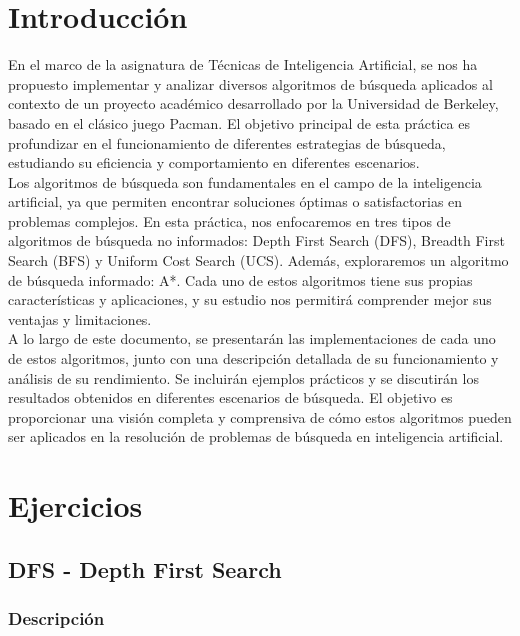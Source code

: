\documentclass{report}
\begin{document}
    \chapter{Introducción}
      {
        En el marco de la asignatura de Técnicas de Inteligencia Artificial, se nos ha propuesto implementar y analizar diversos algoritmos de búsqueda aplicados al contexto de un proyecto académico desarrollado por la Universidad de Berkeley, basado en el clásico juego Pacman. El objetivo principal de esta práctica es profundizar en el funcionamiento de diferentes estrategias de búsqueda, estudiando su eficiencia y comportamiento en diferentes escenarios.\\

        Los algoritmos de búsqueda son fundamentales en el campo de la inteligencia artificial, ya que permiten encontrar soluciones óptimas o satisfactorias en problemas complejos. En esta práctica, nos enfocaremos en tres tipos de algoritmos de búsqueda no informados: Depth First Search (DFS), Breadth First Search (BFS) y Uniform Cost Search (UCS). Además, exploraremos un algoritmo de búsqueda informado: A*. Cada uno de estos algoritmos tiene sus propias características y aplicaciones, y su estudio nos permitirá comprender mejor sus ventajas y limitaciones.\\

        A lo largo de este documento, se presentarán las implementaciones de cada uno de estos algoritmos, junto con una descripción detallada de su funcionamiento y análisis de su rendimiento. Se incluirán ejemplos prácticos y se discutirán los resultados obtenidos en diferentes escenarios de búsqueda. El objetivo es proporcionar una visión completa y comprensiva de cómo estos algoritmos pueden ser aplicados en la resolución de problemas de búsqueda en inteligencia artificial.\\
      }
    \chapter{Ejercicios}
      \section{DFS - Depth First Search}
        \subsection*{Descripción}
\end{document}
